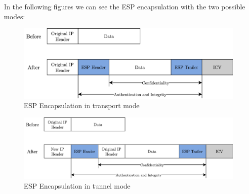 \documentclass[11pt]{book}
\begin{document}
In the following figures we can see the ESP encapsulation with the two possible modes:
\begin{figure}[H]
	\centering
	\includegraphics [scale=0.175] {esp-transport.png}
	\caption{ESP Encapsulation in transport mode}
\end{figure}
\begin{figure}[H]
	\centering
	\includegraphics [scale=0.175] {esp-tunnel.png}
	\caption{ESP Encapsulation in tunnel mode}
\end{figure}
\end{document}
